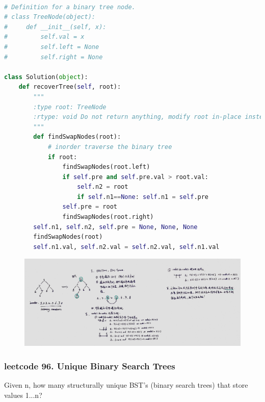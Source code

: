 \documentclass[a4paper,10pt]{article}
\begin{document}
\begin{lstlisting}[language=Python, caption=Problem99. Recover Binary Search Tree]

# Definition for a binary tree node.
# class TreeNode(object):
#     def __init__(self, x):
#         self.val = x
#         self.left = None
#         self.right = None

class Solution(object):
    def recoverTree(self, root):
        """
        :type root: TreeNode
        :rtype: void Do not return anything, modify root in-place instead.
        """
        def findSwapNodes(root):
            # inorder traverse the binary tree
            if root:
                findSwapNodes(root.left)
                if self.pre and self.pre.val > root.val:
                    self.n2 = root
                    if self.n1==None: self.n1 = self.pre
                self.pre = root
                findSwapNodes(root.right)
        self.n1, self.n2, self.pre = None, None, None
        findSwapNodes(root)
        self.n1.val, self.n2.val = self.n2.val, self.n1.val
\end{lstlisting}

\begin{figure}[h]
    \includegraphics[width=\textwidth]{leetcode99.jpg}
    \centering \\
\end{figure}





\subsubsection{leetcode 96. Unique Binary Search Trees}
Given n, how many structurally unique BST's (binary search trees) that store values 1...n? \\
\end{document}

